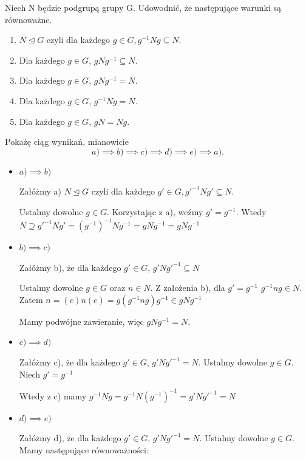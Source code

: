 \begin{problem}[2]
	Niech N będzie podgrupą grupy G. Udowodnić, że następujące warunki są równoważne.

	\begin{enumerate}[label=\alph*)]
		\item $N\unlhd G$ czyli dla każdego $g\in G, g^{-1}Ng \subseteq N$.
		\item Dla każdego $g \in G$, $gNg^{-1}\subseteq N$.
		\item  Dla każdego $g \in G$, $gNg^{-1}= N$.
		\item Dla każdego $g \in G$, $g^{-1}Ng = N$. 
		\item  Dla każdego $g \in G$, $gN = Ng$.  
	\end{enumerate}
\end{problem}
\begin{solution}

	Pokażę ciąg wynikań, mianowicie
	\[
	a)\implies b) \implies c) \implies d) \implies e) \implies a)
	.\] 
	

	\begin{itemize}
		\item $a) \implies b)$ 

			Załóżmy a) $N\unlhd G$ czyli dla każdego $g'\in G, g'^{-1}Ng' \subseteq N$.

			Ustalmy dowolne $g\in G$. Korzystając z a), weźmy $g' = g^{-1}$. Wtedy $N \supseteq g'^{-1}Ng' = \left( g^{-1} \right)^{-1}Ng^{-1} = gNg^{-1} = gNg^{-1}$

		\item $b) \implies c)$ 

			Załóżmy b), że dla każdego $g' \in G$, $g'Ng'^{-1}\subseteq N$
	
			Ustalmy dowolne $g\in G$ oraz $n\in N$.
			Z założenia b), dla $g' = g^{-1}$ $g^{-1}ng \in N$. Zatem $n = \left( e \right) n \left( e \right) = g\left( g^{-1} n g \right)g^{-1} \in gNg^{-1} $
                        
			Mamy podwójne zawieranie, więc $gNg^{-1}=N.$
		\item $c) \implies d)$

			Załóżmy c), że dla każdego $g' \in G$, $g'Ng'^{-1}= N$. 
			Ustalmy dowolne $g\in G$. Niech $g' = g^{-1}$

			
			Wtedy z c) mamy $g^{-1}Ng = g^{-1}N\left( g^{-1} \right)^{-1} = g'Ng'^{-1} = N $
		\item $d) \implies e)$

			Załóżmy d), że dla każdego $g'\in G$, $g'Ng'^{-1} = N$. 
			Ustalmy dowolne $g\in G$.
			Mamy następujące równoważności:


\end{itemize}
\end{solution}
